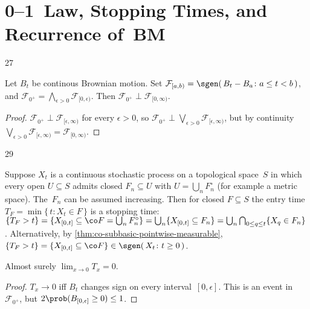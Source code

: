 \section	{0--1~Law, Stopping Times, and Recurrence of~BM}

\setcounter	{block}	{27}
\begin	{theorem}[0--1~law]
Let $B_t$ be continous Brownian motion.
Set \( \mathcal F_{[a,b)} = \sgen(\, B_t - B_a \colon a \le t < b \,) \),
and \( \mathcal F_{0^+} = \bigwedge_{\epsilon>0} \mathcal F_{[0,\epsilon)} \).
Then \( \mathcal F_{0^+} \perp \mathcal F_{[0,\infty)} \).
\end	{theorem}
\begin	{proof}
\( \mathcal F_{0^+} \perp \mathcal F_{[\epsilon,\infty)} \)
for every \( \epsilon > 0 \),
so \( \mathcal F_{0^+}
\perp \bigvee_{\epsilon>0} \mathcal F_{[\epsilon,\infty)} \),
but by continuity \( \bigvee_{\epsilon>0} \mathcal F_{[\epsilon,\infty)}
= \mathcal F_{[0,\infty)} \).
\end	{proof}

\setcounter	{block}	{29}
\begin	{remark}
Suppose $X_t$ is a continuous stochastic process
on a topological space~$S$
in which every open \( U \subseteq S \) admits closed \( F_n \subseteq U \)
with \( U = \bigcup_n F_n^\circ \)
(for example a metric space).
The~$F_n$ can be assumed increasing.
Then for closed \( F \subseteq S \)
the entry time \( T_F = \min\{\, t \colon X_t \in F \,\} \)
is a stopping time:
\(	\{ T_F > t \}
=	\{ X_{[0,t]} \subseteq \co F = \bigcup_n F_n^\circ \}
=	\bigcup_n \{ X_{[0,t]} \subseteq F_n \}
=	\bigcup_n \bigcap_{0\le q\le t} \{ X_q \in F_n \}
\).
Alternatively, by \autoref{thm:co-subbasic-pointwise-measurable},
\( \{T_F > t\} = \{X_{[0,t]} \subseteq \co F\}
\in \sgen(\, X_t \colon t \ge 0 \,) \).
\end	{remark}

\begin	{proposition}
Almost surely \( \lim_{x\to0} T_x = 0 \).
\end	{proposition}
\begin	{proof}
\( T_x \to 0 \) iff $B_t$ changes sign on every interval~$[0,\epsilon]$.
This is an event in~$\mathcal F_{0^+}$,
but \( 2\prob(B_{[0,\epsilon]} \ge 0) \le 1 \).
\end	{proof}
